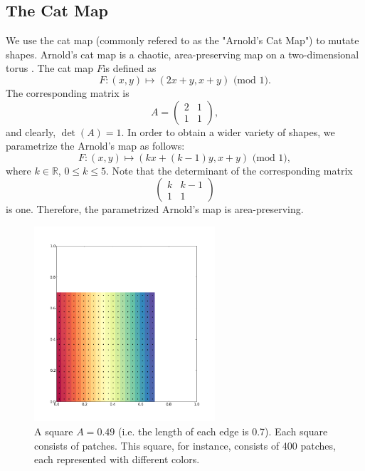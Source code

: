 \documentclass[12pt]{article}
\begin{document}
\subsection{The Cat Map}
We use the cat map (commonly refered to as the "Arnold's Cat Map") to mutate shapes.
Arnold's cat map is a chaotic, area-preserving map on a two-dimensional torus \citep{hilborn}.
The cat map $F$is defined as
\begin{equation*}
  F: (x,y) \mapsto (2x + y, x + y) \mbox{ (mod 1)}.
\end{equation*}
The corresponding matrix is
\begin{equation*}
A =
\begin{pmatrix}
    2 & 1  \\
    1 & 1  
  \end{pmatrix},
\end{equation*}
and clearly, $\det(A) = 1$.
In order to obtain a wider variety of shapes, we parametrize the Arnold's map as follows:
\begin{equation*}
  F: (x,y) \mapsto (kx + (k-1)y, x + y) \mbox{ (mod 1)},
\end{equation*}
where $k \in \mathbb{R}$, $0 \leq k \leq 5$.
Note that the determinant of the corresponding matrix
\begin{equation*}
\begin{pmatrix}
    k & k-1  \\
    1 & 1  
  \end{pmatrix}
\end{equation*}
is one.
Therefore, the parametrized Arnold's map is area-preserving.
\begin{figure}[t]
  \centering
  \includegraphics[width=0.6\textwidth]{square049_400}
  \caption{A square $A = 0.49$ (i.e. the length of each edge is 0.7). Each square consists of patches. This square, for instance, consists of 400 patches, each represented with different colors.}
  \label{fig:catmap_demo}
\end{figure}
\end{document}
